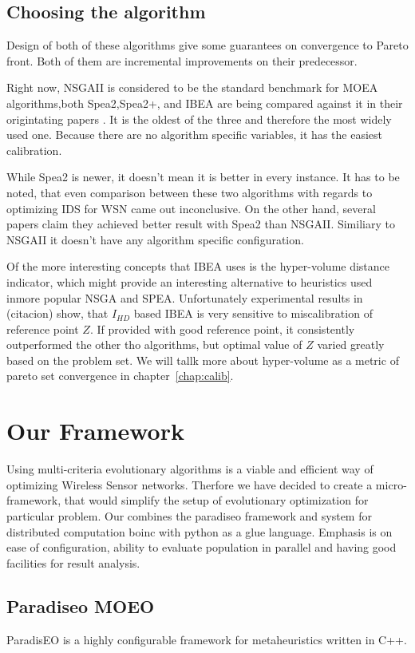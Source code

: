 \documentclass[12pt,oneside]{fithesis2}
\begin{document}
\section{Choosing the algorithm}
Design of both of these algorithms give some guarantees on convergence to Pareto front. Both of them are incremental improvements on their predecessor. 

Right now, NSGAII is considered to be the standard benchmark for MOEA algorithms,both Spea2,Spea2+, and IBEA are being compared against it in their origintating papers . It is the oldest of the three and therefore the most widely used one. Because there are no algorithm specific variables, it has the easiest calibration.
       
       While Spea2 is newer, it doesn't mean it is better in every instance. It has to be noted, that even comparison between these two algorithms with regards to optimizing IDS for WSN came out inconclusive.\cite{stehl2013opt} On the other hand, several papers claim they achieved better result with Spea2 than NSGAII. Similiary to NSGAII it doesn't have any algorithm specific configuration.  

Of the more interesting concepts that IBEA uses is the hyper-volume distance indicator, which might provide an interesting alternative to heuristics used inmore popular NSGA and SPEA. Unfortunately experimental results in (citacion) show, that $I_{HD}$ based IBEA is very sensitive to miscalibration of reference point $Z$. If provided with good reference point, it consistently outperformed the other tho algorithms, but optimal value of $Z$ varied greatly based on the problem set. We will tallk more about hyper-volume as a metric of pareto set convergence in chapter~\ref{chap:calib}.


\chapter{Our Framework}
\label{chap:framework}
Using multi-criteria evolutionary algorithms is a viable and efficient way of optimizing Wireless Sensor networks\cite{stehl2013opt}. Therfore we have decided to create a micro-framework, that would simplify the setup of evolutionary optimization for particular problem.
Our combines the paradiseo framework and system for distributed computation boinc with python as a glue language. Emphasis is on ease of configuration, ability to evaluate population in parallel and having good facilities for result analysis.

\section{Paradiseo MOEO}
ParadisEO is a highly configurable framework for metaheuristics written in C++.\cite{liefooghe2007paradiseo} 
\end{document}
